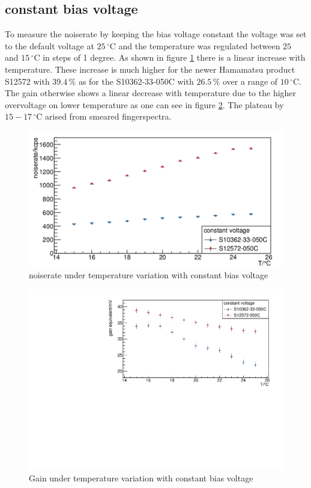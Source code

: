 \subsection{constant bias voltage}
To measure the noiserate by keeping the bias voltage constant the voltage was set to the default voltage at $25\,\mathrm{^{\circ}C}$ and the temperature was regulated between $25$ and $15\,\mathrm{^{\circ}C}$ in steps of 1 degree. As shown in figure \ref{constVolt_rate} there is a linear increase with temperature. These increase is much higher for the newer Hamamatsu product S12572 with $39.4\,\mathrm{\%}$ as for the S10362-33-050C with $26.5\,\mathrm{\%}$ over a range of $10\,\mathrm{^{\circ}C}$. 
The gain otherwise shows a linear decrease with temperature due to the higher overvoltage on lower temperature as one can see in figure \ref{constVolt_gain}. The plateau by $15 - 17\,\mathrm{^{\circ}C}$ arised from smeared fingerspectra.  
\begin{figure}[h]
	\centering
	\includegraphics[width = 0.75 \textwidth]{Figures/radermacher/ConstVolt_Rate_linear.pdf}
	\caption{noiserate under temperature variation with constant bias voltage}
	\label{constVolt_rate}
\end{figure}
\begin{figure}[h]
	\centering
	\includegraphics[width = 0.75 \textwidth]{Figures/radermacher/constVolt_Gain.pdf}
	\caption{Gain under temperature variation with constant bias voltage}
	\label{constVolt_gain}
\end{figure}
